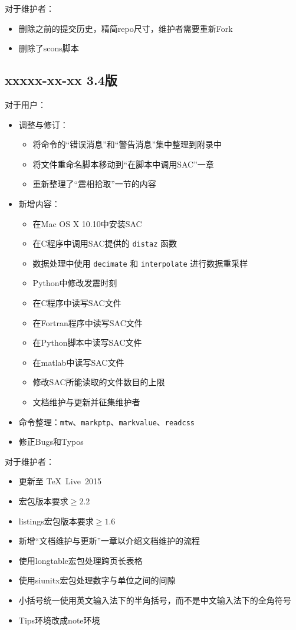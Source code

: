 对于维护者：
\begin{itemize}
\item 删除之前的提交历史，精简repo尺寸，维护者需要重新Fork
\item 删除了scons脚本
\end{itemize}

\subsection*{xxxxx-xx-xx 3.4版}
对于用户：
\begin{itemize}
\item 调整与修订：
    \begin{itemize}
    \item 将命令的``错误消息''和``警告消息''集中整理到附录中
    \item 将文件重命名脚本移动到``在脚本中调用SAC''一章
    \item 重新整理了``震相拾取''一节的内容
    \end{itemize}
\item 新增内容：
    \begin{itemize}
    \item 在Mac OS X 10.10中安装SAC
    \item 在C程序中调用SAC提供的 \texttt{distaz} 函数
    \item 数据处理中使用 \texttt{decimate} 和 \texttt{interpolate} 进行数据重采样
    \item Python中修改发震时刻
    \item 在C程序中读写SAC文件
    \item 在Fortran程序中读写SAC文件
    \item 在Python脚本中读写SAC文件
    \item 在matlab中读写SAC文件
    \item 修改SAC所能读取的文件数目的上限
    \item 文档维护与更新并征集维护者
    \end{itemize}
\item 命令整理：\texttt{mtw}、\texttt{markptp}、\texttt{markvalue}、\texttt{readcss}
\item 修正Bugs和Typos
\end{itemize}

对于维护者：
\begin{itemize}
\item 更新至 \TeX~Live~2015
\item \CTeX 宏包版本要求$\geq 2.2$
\item listings宏包版本要求$\geq 1.6$
\item 新增``文档维护与更新''一章以介绍文档维护的流程
\item 使用longtable宏包处理跨页长表格
\item 使用siunitx宏包处理数字与单位之间的间隙
\item 小括号统一使用英文输入法下的半角括号，而不是中文输入法下的全角符号
\item Tips环境改成note环境
\end{itemize}
